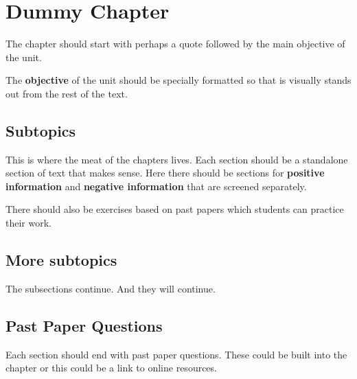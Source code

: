 \chapter{Dummy Chapter}

The chapter should start with perhaps a quote followed by the main objective of the unit. 

The \textbf{objective} of the unit should be specially formatted so that is visually stands out from the rest of the text.


\section{Subtopics}
This is where the meat of the chapters lives. Each section should be a standalone section of text that makes sense. Here there should be sections for \textbf{positive information} and \textbf{negative information} that are screened separately. 

There should also be exercises based on past papers which students can practice their work.



\section{More subtopics}

The subsections continue. And they will continue.


\section{Past Paper Questions}

Each section should end with past paper questions. These could be built into the chapter or this could be a link to online resources.